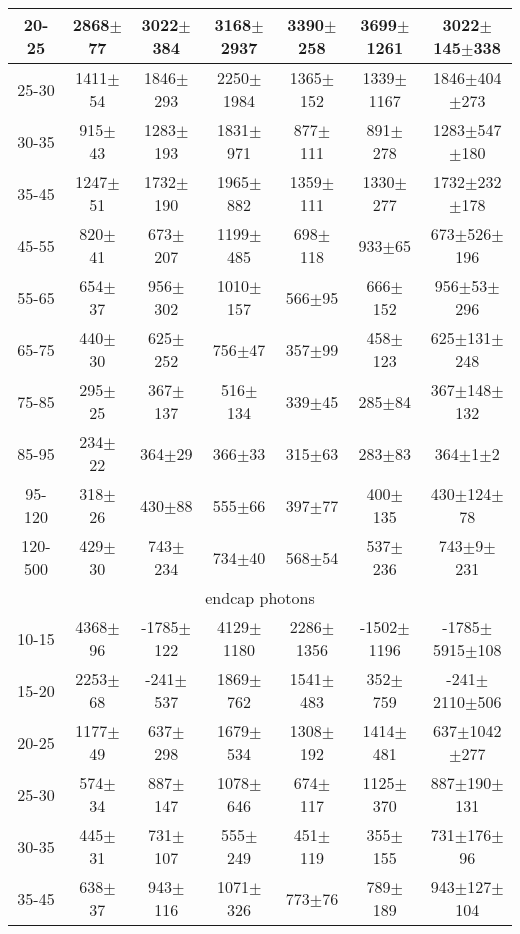 \begin{table}[h]
\begin{center}
\begin{tabular}{|c|c|c|c|c|c|c|}
    20-25 & 2868$\pm$77 & 3022$\pm$384 & 3168$\pm$2937 & 3390$\pm$258 & 3699$\pm$1261 &3022$\pm$145$\pm$338  \\ \hline
    25-30 & 1411$\pm$54 & 1846$\pm$293 & 2250$\pm$1984 & 1365$\pm$152 & 1339$\pm$1167 &1846$\pm$404$\pm$273  \\ \hline
    30-35 & 915$\pm$43 & 1283$\pm$193 & 1831$\pm$971 & 877$\pm$111 & 891$\pm$278 &1283$\pm$547$\pm$180  \\ \hline
    35-45 & 1247$\pm$51 & 1732$\pm$190 & 1965$\pm$882 & 1359$\pm$111 & 1330$\pm$277 &1732$\pm$232$\pm$178  \\ \hline
    45-55 & 820$\pm$41 & 673$\pm$207 & 1199$\pm$485 & 698$\pm$118 & 933$\pm$65 &673$\pm$526$\pm$196  \\ \hline
    55-65 & 654$\pm$37 & 956$\pm$302 & 1010$\pm$157 & 566$\pm$95 & 666$\pm$152 &956$\pm$53$\pm$296  \\ \hline
    65-75 & 440$\pm$30 & 625$\pm$252 & 756$\pm$47 & 357$\pm$99 & 458$\pm$123 &625$\pm$131$\pm$248  \\ \hline
    75-85 & 295$\pm$25 & 367$\pm$137 & 516$\pm$134 & 339$\pm$45 & 285$\pm$84 &367$\pm$148$\pm$132  \\ \hline
    85-95 & 234$\pm$22 & 364$\pm$29 & 366$\pm$33 & 315$\pm$63 & 283$\pm$83 &364$\pm$1$\pm$2  \\ \hline
    95-120 & 318$\pm$26 & 430$\pm$88 & 555$\pm$66 & 397$\pm$77 & 400$\pm$135 &430$\pm$124$\pm$78  \\ \hline
    120-500 & 429$\pm$30 & 743$\pm$234 & 734$\pm$40 & 568$\pm$54 & 537$\pm$236 &743$\pm$9$\pm$231  \\ \hline
    \multicolumn{7}{|c|}{endcap photons} \\ \hline
    10-15 & 4368$\pm$96 & -1785$\pm$122 & 4129$\pm$1180 & 2286$\pm$1356 & -1502$\pm$1196 &-1785$\pm$5915$\pm$108  \\ \hline
    15-20 & 2253$\pm$68 & -241$\pm$537 & 1869$\pm$762 & 1541$\pm$483 & 352$\pm$759 &-241$\pm$2110$\pm$506  \\ \hline
    20-25 & 1177$\pm$49 & 637$\pm$298 & 1679$\pm$534 & 1308$\pm$192 & 1414$\pm$481 &637$\pm$1042$\pm$277  \\ \hline
    25-30 & 574$\pm$34 & 887$\pm$147 & 1078$\pm$646 & 674$\pm$117 & 1125$\pm$370 &887$\pm$190$\pm$131  \\ \hline
    30-35 & 445$\pm$31 & 731$\pm$107 & 555$\pm$249 & 451$\pm$119 & 355$\pm$155 &731$\pm$176$\pm$96  \\ \hline
    35-45 & 638$\pm$37 & 943$\pm$116 & 1071$\pm$326 & 773$\pm$76 & 789$\pm$189 &943$\pm$127$\pm$104  \\ \hline

\end{tabular}
\end{center}
\end{table}
